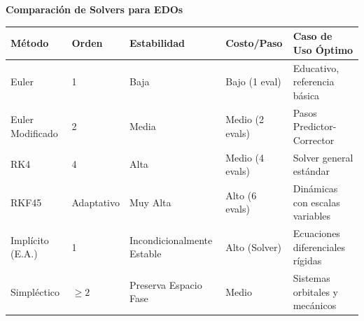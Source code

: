 \documentclass[10pt, landscape, twocolumn]{article}
\begin{document}
{\vspace{1em}
\textbf{\Large Comparación de Solvers para EDOs}
\vspace{0.3em}

\noindent
\begin{tabularx}{0.95\linewidth}{l l X X X}
\toprule
\textbf{Método} & \textbf{Orden} & \textbf{Estabilidad} & \textbf{Costo/Paso} & \textbf{Caso de Uso Óptimo} \\
\midrule
Euler & 1 & Baja & Bajo (1 eval) & Educativo, referencia básica \\
Euler Modificado & 2 & Media & Medio (2 evals) & Pasos Predictor-Corrector \\
RK4 & 4 & Alta & Medio (4 evals) & Solver general estándar \\
RKF45 & Adaptativo & Muy Alta & Alto (6 evals) & Dinámicas con escalas variables \\
Implícito (E.A.) & 1 & Incondicionalmente Estable & Alto (Solver) & Ecuaciones diferenciales rígidas \\
Simpléctico & $\ge 2$ & Preserva Espacio Fase & Medio & Sistemas orbitales y mecánicos \\
\bottomrule
\end{tabularx}

\par
}

\vspace*{\fill}
\twocolumn
\flushbottom
\end{document}
